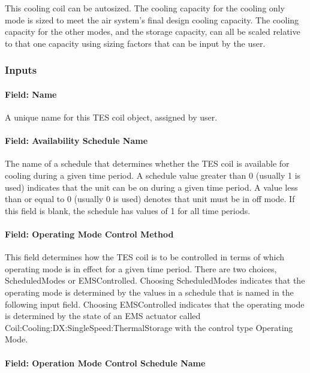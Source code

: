 This cooling coil can be autosized. The cooling capacity for the cooling only mode is sized to meet the air system's final design cooling capacity. The cooling capacity for the other modes, and the storage capacity, can all be scaled relative to that one capacity using sizing factors that can be input by the user.

\subsubsection{Inputs}\label{inputs-35}

\paragraph{Field: Name}\label{field-name-34}

A unique name for this TES coil object, assigned by user.

\paragraph{Field: Availability Schedule Name}\label{field-availability-schedule-name-15}

The name of a schedule that determines whether the TES coil is available for cooling during a given time period. A schedule value greater than 0 (usually 1 is used) indicates that the unit can be on during a given time period. A value less than or equal to 0 (usually 0 is used) denotes that unit must be in off mode. If this field is blank, the schedule has values of 1 for all time periods.

\paragraph{Field: Operating Mode Control Method}\label{field-operating-mode-control-method}

This field determines how the TES coil is to be controlled in terms of which operating mode is in effect for a given time period. There are two choices, ScheduledModes or EMSControlled. Choosing ScheduledModes indicates that the operating mode is determined by the values in a schedule that is named in the following input field. Choosing EMSControlled indicates that the operating mode is determined by the state of an EMS actuator called Coil:Cooling:DX:SingleSpeed:ThermalStorage with the control type Operating Mode.

\paragraph{Field: Operation Mode Control Schedule Name}\label{field-operation-mode-control-schedule-name}

